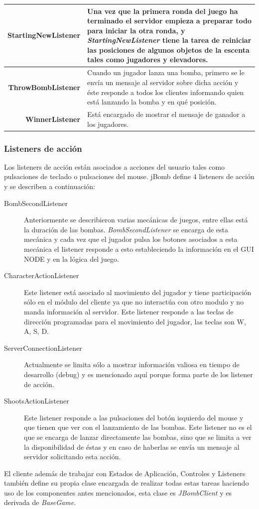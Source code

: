 \documentclass[a4paper,12pt,openany,oneside]{book}
\begin{document}
\begin{center}
\begin{tabular}{|r|p{10cm}|}
\hline
\textbf{StartingNewListener} & Una vez que la primera ronda del juego ha terminado el servidor empieza a preparar todo para iniciar la otra ronda, y \textit{StartingNewListener} tiene la tarea de reiniciar las posiciones de algunos objetos de la escenta tales como jugadores y elevadores.\\	
\hline
\textbf{ThrowBombListener} & Cuando un jugador lanza una bomba, primero se le envía un mensaje al servidor sobre dicha acción y éste responde a todos los clientes informando quien está lanzando la bomba y en qué posición.\\	
\hline
\textbf{WinnerListener} & Está encargado de mostrar el mensaje de ganador a los jugadores. \\	
\hline
\end{tabular}
\end{center}
\subsubsection{Listeners de acción}
Los listeners de acción están asociados a acciones del usuario tales como pulsaciones de teclado o pulsaciones del mouse. jBomb define 4 listeners de acción y se describen a continuación:
\begin{description}
\item[BombSecondListener] Anteriormente se describieron varias mecánicas de juegos, entre ellas está la duración de las bombas. \textit{BombSecondListener} se encarga de esta mecánica y cada vez que el jugador pulsa los botones asociados a esta mecánica el listener responde a esto estableciendo la información en el GUI NODE y en la lógica del juego.
\item[CharacterActionListener] Este listener está asociado al movimiento del jugador y tiene participación sólo en el módulo del cliente ya que no interactúa con otro modulo y no manda información al servidor. Este listener responde a las teclas de dirección programadas para el movimiento del jugador, las teclas son W, A, S, D.
\item[ServerConnectionListener] Actualmente se limita sólo a mostrar información valiosa en tiempo de desarrollo (debug) y es mencionado aquí porque forma parte de los listener de acción.
\item[ShootsActionListener] Este listener responde a las pulsaciones del botón isquierdo del mouse y que tienen que ver con el lanzamiento de las bombas. Este listener no es el que se encarga de lanzar directamente las bombas, sino que se limita a ver la disponibilidad de éstas y en caso de haberlas se envía un mensaje al servidor solicitando esta acción.
\end{description}
El cliente además de trabajar con Estados de Aplicación, Controles y Listeners también define su propia clase encargada de realizar todas estas tareas haciendo uso de los componentes antes mencionados, esta clase es \textit{JBombClient} y es derivada de \textit{BaseGame}.
\end{document}
